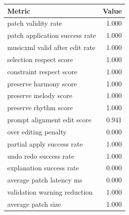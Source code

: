 \begin{tabular}{lr}
\toprule
Metric & Value \\
\midrule
patch validity rate & 1.000 \\
patch application success rate & 1.000 \\
musicxml valid after edit rate & 1.000 \\
selection respect score & 1.000 \\
constraint respect score & 1.000 \\
preserve harmony score & 1.000 \\
preserve melody score & 1.000 \\
preserve rhythm score & 1.000 \\
prompt alignment edit score & 0.941 \\
over editing penalty & 0.000 \\
partial apply success rate & 1.000 \\
undo redo success rate & 1.000 \\
explanation success rate & 0.000 \\
average patch latency ms & 0.000 \\
validation warning reduction & 1.000 \\
average patch size & 1.000 \\
\bottomrule
\end{tabular}

